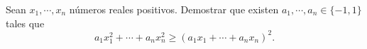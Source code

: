 Sean $x_1, \cdots , x_n$ números reales positivos. Demostrar que existen $a_1, \cdots , a_n \in \{ -1,1 \}$ tales que
\[ a_1 x_1^2 + \cdots + a_n x_n^2 \geq (a_1 x_1 + \cdots + a_n x_n)^2.\]

